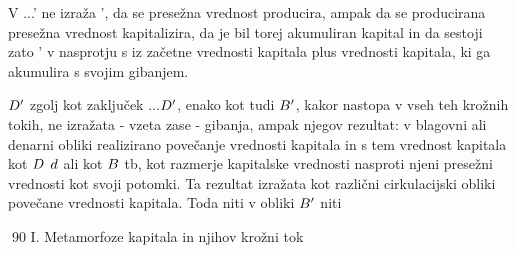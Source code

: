 \documentclass[kapital_02.tex]{subfiles}
\begin{document}
V \KPEP...\KPEP' ne izraža \KPEP', da se presežna vrednost producira, ampak da se producirana presežna vrednost kapitalizira, da je bil torej akumuliran kapital in da sestoji zato \KPEP' v nasprotju s \KPEP iz začetne vrednosti kapitala plus vrednosti kapitala, ki ga akumulira s svojim gibanjem.

\( D' \) zgolj kot zaključek \KPED...\( D' \), enako kot tudi \( B' \), kakor nastopa v vseh teh krožnih tokih, ne izražata - vzeta zase - gibanja, ampak njegov rezultat: v blagovni ali denarni obliki realizirano povečanje vrednosti kapitala in s tem vrednost kapitala kot \( D \) \( d \) ali kot \( B \) tb, kot razmerje kapitalske vrednosti nasproti njeni presežni vrednosti kot svoji potomki. Ta rezultat izražata kot različni cirkulacijski obliki povečane vrednosti kapitala. Toda niti v obliki \( B' \) niti



90 I. Metamorfoze kapitala in njihov krožni tok
\end{document}
